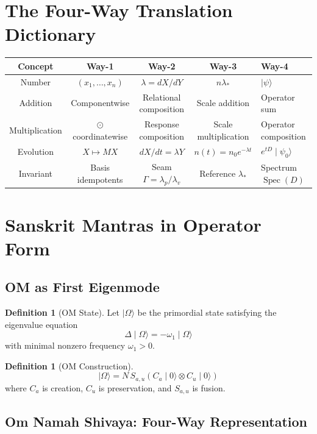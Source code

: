 \documentclass[12pt, reqno]{amsart}
\theoremstyle{plain}
\theoremstyle{definition}
\newtheorem{definition}[theorem]{Definition}
\theoremstyle{remark}
\DeclareMathOperator{\Spec}{Spec}
\newcommand{\lstar}{\lambda_{*}}
\newcommand{\seam}{\Gamma}
\begin{document}
\section{The Four-Way Translation Dictionary}

\begin{center}
\begin{tabular}{|c|c|c|c|}
\hline
\textbf{Concept} & \textbf{Way-1} & \textbf{Way-2} & \textbf{Way-3} & \textbf{Way-4} \\
\hline
Number & $(x_1,\ldots,x_n)$ & $\lambda = dX/dY$ & $n\lstar$ & $\mid \psi\rangle$ \\
\hline
Addition & Componentwise & Relational composition & Scale addition & Operator sum \\
\hline
Multiplication & $\odot$ coordinatewise & Response composition & Scale multiplication & Operator composition \\
\hline
Evolution & $X \mapsto MX$ & $dX/dt = \lambda Y$ & $n(t) = n_0 e^{-\lambda t}$ & $e^{tD}\mid\psi_0\rangle$ \\
\hline
Invariant & Basis idempotents & Seam $\seam = \lambda_p/\lambda_v$ & Reference $\lstar$ & Spectrum $\Spec(D)$ \\
\hline
\end{tabular}
\end{center}

\section{Sanskrit Mantras in Operator Form}

\subsection{OM as First Eigenmode}

\begin{definition}[OM State]
Let $\mid \Omega\rangle$ be the primordial state satisfying the eigenvalue equation
\[
\Delta \mid \Omega\rangle = -\omega_1 \mid \Omega\rangle
\]
with minimal nonzero frequency $\omega_1 > 0$.
\end{definition}

\begin{definition}[OM Construction]
\[
\mid \Omega\rangle = N\, S_{a,u}(C_a\mid 0\rangle \otimes C_u\mid 0\rangle)
\]
where $C_a$ is creation, $C_u$ is preservation, and $S_{a,u}$ is fusion.
\end{definition}

\subsection{Om Namah Shivaya: Four-Way Representation}
\end{document}

